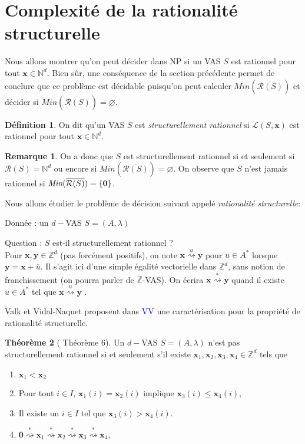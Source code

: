 \documentclass[a4paper,final]{article}
\theoremstyle{definition}
\newtheorem{Theorem}{Théorème}
\newtheorem{Definition}[Theorem]{Définition}
\newtheorem*{Remark}{Remarque}
\let\leq\leqslant
\newcommand{\alain}[1]{\textcolor{blue}{#1}}
\newcommand{\os}[1]{\left\{\mathinner{#1}\right\}}
\let\vide\varnothing
\newcommand{\Min}{\textit{Min}}
\newcommand{\N}{\ensuremath{\mathbb{N}}}
\newcommand{\Z}{\ensuremath{\mathbb{Z}}}
\newcommand{\lang}{\ensuremath{\mathcal{L}}}
\newcommand{\transZ}[1]{\ensuremath{\stackrel{#1}{\rightsquigarrow}}}
\newcommand{\vect}[1]{\ensuremath{\mathbf{#1}}}
\newcommand{\valeur}[1]{\ensuremath{\overline{#1}}}
\newcommand{\inirat}{\mathcal{R}}
\begin{document}
\section{Complexité de la rationalité structurelle}

Nous allons montrer qu'on peut décider dans NP si un VAS $S$ est rationnel pour tout $\vect{x} \in \N^d$. Bien sûr, une conséquence de la section précédente permet de conclure que ce problème est décidable puisqu'on peut calculer $\Min(\overline{\inirat(S)})$ et décider si $\Min(\overline{\inirat(S)})=\vide$.

\begin{Definition}
On dit qu'un VAS $S$ est \emph{structurellement rationnel} si $\lang(S,\vect{x})$ est rationnel pour tout $\vect{x} \in \N^d$.
\end{Definition}

\begin{Remark}
On a donc que $S$ est structurellement rationnel si et seulement si $\inirat(S) = \N^d$ ou encore si
 $\Min(\overline{\inirat(S)})=\vide$. On observe que $S$ n'est jamais rationnel si $\Min(\overline{\inirat(S)})=\os{\vect{0}}$.  
\end{Remark}

Nous allons étudier le problème de décision suivant appelé \emph{rationalité structurelle}:

Donnée : un $d-$VAS $S=(A,\lambda)$

Question : $S$ est-il structurellement rationnel ? \\

Pour $\vect{x},\vect{y}\in\Z^d$ (pas forcément positifs), on note $\vect{x} \transZ{u} \vect{y}$ pour $u\in A^*$ lorsque $\vect{y} = \vect{x} + \valeur{u}$.
Il s'agit ici d'une simple égalité vectorielle dans $\Z^d$, sans notion de franchissement (on pourra parler de $\Z$-VAS).
On écrira $\vect{x} \transZ{*} \vect{y}$ quand il existe $u\in A^*$ tel que $\vect{x} \transZ{u} \vect{y}$ .

Valk et Vidal-Naquet proposent dans \cite{vavn81} \alain{VV} une caractérisation pour la propriété de rationalité structurelle.

\begin{Theorem}[\cite{vavn81} Théorème 6]\label{VVTheo}
Un $d-$VAS $S=(A,\lambda)$ n'est pas structurellement rationnel si et seulement s'il existe $\vect{x}_1, \vect{x}_2, \vect{x}_3, \vect{x}_4 \in \Z^d$ tels que 
\begin{enumerate}
    \item $\vect{x}_1 < \vect{x}_2$
    \item Pour tout $i \in I$, $\vect{x}_1(i) = \vect{x}_2(i)$ implique $\vect{x}_3(i) \leq \vect{x}_4(i)$,
    \item Il existe un $i\in I$ tel que $\vect{x}_3(i) > \vect{x}_4(i)$.
    
    \item $\vect{0} \transZ{*} \vect{x}_1 \transZ{*} \vect{x}_2 \transZ{*} \vect{x}_3 \transZ{*} \vect{x}_4$,
\end{enumerate}
\end{Theorem}
\end{document}
